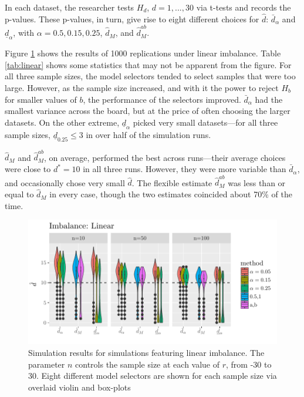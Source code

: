 \documentclass[12pt]{article}\usepackage[]{graphicx}\usepackage[]{color}
\makeatletter
\def\maxwidth{ %
  \ifdim\Gin@nat@width>\linewidth
    \linewidth
  \else
    \Gin@nat@width
  \fi
}
\newcommand{\dalphaU}{\bar{d}_\alpha}
\newcommand{\dalphaB}{\underline{d}_\alpha}
\newcommand{\dstar}{d^*}
\newcommand{\dhatB}{\underline{d}}
\newcommand{\dhatm}{\hat{d}_M}
\newcommand{\dhatmab}{\hat{d}^{ab}_M}
\makeatother
\begin{document}
In each dataset, the researcher tests $H_d$, $d=1,...,30$ via t-tests
and records the p-values.
These p-values, in turn, give rise to eight different choices for
$\hat{d}$: $\dalphaU$ and $\dalphaB$, with $\alpha=0.5,0.15,0.25$,
$\dhatm$, and $\dhatmab$.

Figure \ref{fig:linImb} shows the results of 1000 replications
under linear imbalance.
Table \ref{tab:linear} shows some statistics that may not be apparent
from the figure.
For all three sample sizes, the model selectors tended to select
samples that were too large.
However, as the sample size increased, and with it the power to reject
$H_b$ for smaller values of $b$, the performance of the selectors
improved.
$\dalphaU$ had the smallest
variance across the board, but at the
price of often choosing the larger datasets.
On the other extreme, $\dalphaB$ picked very small datasets---for all
three sample sizes, $\dhatB_{0.25}\le 3$ in over half of the
simulation runs.

$\dhatm$ and $\dhatmab$, on average, performed the best across
runs---their average choices were close to $\dstar=10$ in all three
runs.
However, they were more variable than $\dalphaU$, and occasionally
chose very small $\hat{d}$.
The flexible estimate $\dhatmab$ was less than or equal to $\dhatm$ in
every case, though the two estimates coincided about
70\% of the time.



\begin{figure}

\includegraphics[width=\maxwidth]{figure/linearImbalance-1} 

\caption{Simulation results for simulations featuring linear
  imbalance. The parameter $n$ controls the sample size at each value
  of $r$, from -30 to 30. Eight different model selectors are shown
  for each sample size via overlaid violin and box-plots}
\label{fig:linImb}
\end{figure}
\end{document}
